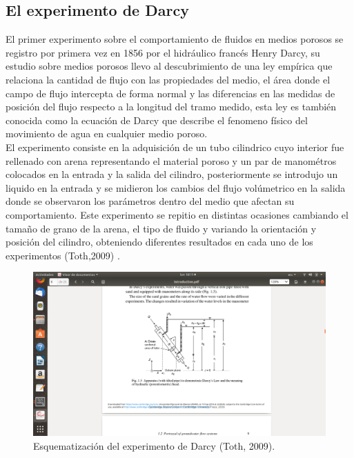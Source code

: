 \subsection{El experimento de Darcy}

El primer experimento sobre el comportamiento de fluidos en medios porosos se registro por primera vez en 1856 por el hidráulico francés Henry Darcy, su estudio sobre medios porosos llevo al descubrimiento de una ley empírica que relaciona la cantidad de flujo con las propiedades del medio, el área donde el campo de flujo intercepta de forma normal y las diferencias en las medidas de posición del flujo respecto a la longitud del tramo medido, esta ley es también conocida como la ecuación de Darcy que describe el fenomeno físico del movimiento de agua en cualquier medio poroso.
\\

El experimento consiste en la adquisición de un tubo cilindrico cuyo interior fue rellenado con arena representando el material poroso y un par de manométros colocados en la entrada y la salida del cilindro, posteriormente se introdujo un liquido en la entrada y se midieron los cambios del flujo volúmetrico en la salida donde se observaron los parámetros dentro del medio que afectan su comportamiento. Este experimento se repitio en distintas ocasiones cambiando el tamaño de grano de la arena, el tipo de fluido y variando la orientación y posición del cilindro, obteniendo diferentes resultados en cada uno de los experimentos (Toth,2009) \cite{Toth2009}.


\begin{figure}[ht!]
\centering
\includegraphics[scale=0.70]{Figura1.png}
\caption{Esquematización del experimento de Darcy (Toth, 2009).}
\label{Figura1:1.1} 
\end{figure}

